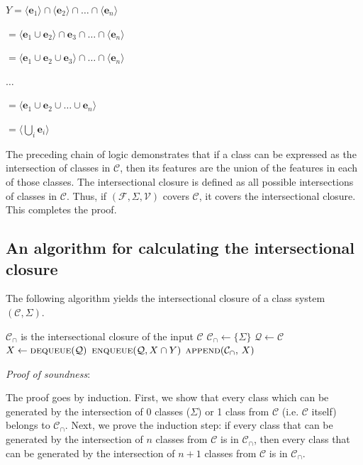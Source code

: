 \documentclass[11pt, oneside]{article}   	%
\begin{document}
$Y = \langle \mathbf{e}_1 \rangle \cap  \langle \mathbf{e}_2 \rangle \cap \ldots \cap  \langle \mathbf{e}_n \rangle$

\quad $ = \langle \mathbf{e}_1 \cup \mathbf{e}_2 \rangle \cap \mathbf{e}_3 \cap \ldots \cap \langle \mathbf{e}_n \rangle$

\quad $ = \langle \mathbf{e}_1 \cup \mathbf{e}_2 \cup \mathbf{e}_3 \rangle \cap \ldots \cap \langle \mathbf{e}_n \rangle$

\quad $\ldots$

\quad $= \langle \mathbf{e}_1 \cup \mathbf{e}_2 \cup \ldots \cup \mathbf{e}_n \rangle$

\quad $= \langle \bigcup_i  \mathbf{e}_i \rangle$

\noindent The preceding chain of logic demonstrates that if a class can be expressed as the intersection of classes in $\mathcal C$, then its features are the union of the features in each of those classes. The intersectional closure is defined as all possible intersections of classes in $\mathcal C$. Thus, if $(\mathcal F, \Sigma, \mathcal V)$ covers $\mathcal C$, it covers the intersectional closure. This completes the proof.

\subsection{An algorithm for calculating the intersectional closure}

The following algorithm yields the intersectional closure of a class system $(\mathcal C, \Sigma)$.

\noindent \begin{algorithmic}
    \ENSURE $\mathcal C_\cap$ is the intersectional closure of the input $\mathcal C$
    \STATE
    \STATE $\mathcal C_\cap \leftarrow \{ \Sigma \} $
    \STATE $\mathcal Q \leftarrow \mathcal C$
    \STATE
        \STATE $X \leftarrow \textsc{dequeue}(\mathcal Q)$
                \STATE $\textsc{enqueue}(\mathcal Q, X \cap Y)$
            \ENDFOR
            \STATE $\textsc{append}(\mathcal C_\cap, \, X)$
        \ENDIF
    \ENDWHILE
\end{algorithmic}

\vspace{\baselineskip} \noindent \textit{Proof of soundness}:

The proof goes by induction. First, we show that every class which can be generated by the intersection of $0$ classes ($\Sigma$) or 1 class from $\mathcal C$ (i.e. $\mathcal C$ itself) belongs to $\mathcal C_\cap$. Next, we prove the induction step: if every class that can be generated by the intersection of $n$ classes from $\mathcal C$ is in $\mathcal C_\cap$, then every class that can be generated by the intersection of $n+1$ classes from $\mathcal C$ is in $\mathcal C_\cap$.
\end{document}
